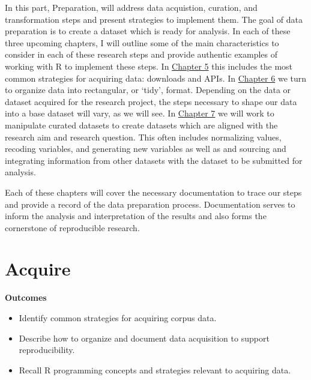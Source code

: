 \documentclass[
  letterpaper,
]{book}
\providecommand{\tightlist}{%
  \setlength{\itemsep}{0pt}\setlength{\parskip}{0pt}}\usepackage{longtable,booktabs,array}
\theoremstyle{definition}
\theoremstyle{remark}
\begin{document}
In this part, Preparation, will address data acquistion, curation, and
transformation steps and present strategies to implement them. The goal
of data preparation is to create a dataset which is ready for analysis.
In each of these three upcoming chapters, I will outline some of the
main characteristics to consider in each of these research steps and
provide authentic examples of working with R to implement these steps.
In \hyperref[sec-acquire-chapter]{Chapter 5} this includes the most
common strategies for acquiring data: downloads and APIs. In
\hyperref[sec-curate-data]{Chapter 6} we turn to organize data into
rectangular, or `tidy', format. Depending on the data or dataset
acquired for the research project, the steps necessary to shape our data
into a base dataset will vary, as we will see. In
\hyperref[sec-transform-data]{Chapter 7} we will work to manipulate
curated datasets to create datasets which are aligned with the research
aim and research question. This often includes normalizing values,
recoding variables, and generating new variables as well as and sourcing
and integrating information from other datasets with the dataset to be
submitted for analysis.

Each of these chapters will cover the necessary documentation to trace
our steps and provide a record of the data preparation process.
Documentation serves to inform the analysis and interpretation of the
results and also forms the cornerstone of reproducible research.

\chapter{Acquire}\label{sec-acquire-chapter}

\begin{tcolorbox}[enhanced jigsaw, breakable, colframe=quarto-callout-color-frame, toprule=.15mm, arc=.35mm, colback=white, left=2mm, bottomrule=.15mm, rightrule=.15mm, opacityback=0, leftrule=.75mm]

\textbf{ Outcomes}

\begin{itemize}
\tightlist
\item
  Identify common strategies for acquiring corpus data.
\item
  Describe how to organize and document data acquisition to support
  reproducibility.
\item
  Recall R programming concepts and strategies relevant to acquiring
  data.
\end{itemize}

\end{tcolorbox}
\end{document}
